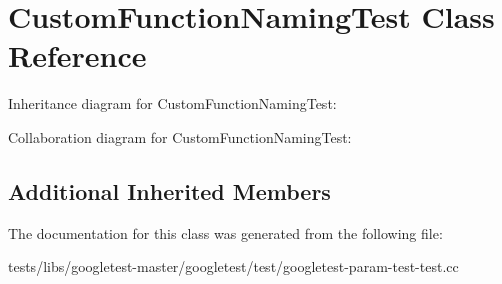 \hypertarget{classCustomFunctionNamingTest}{}\section{Custom\+Function\+Naming\+Test Class Reference}
\label{classCustomFunctionNamingTest}


Inheritance diagram for Custom\+Function\+Naming\+Test\+:


Collaboration diagram for Custom\+Function\+Naming\+Test\+:
\subsection*{Additional Inherited Members}


The documentation for this class was generated from the following file\+:\begin{DoxyCompactItemize}
\item 
tests/libs/googletest-\/master/googletest/test/googletest-\/param-\/test-\/test.\+cc\end{DoxyCompactItemize}
